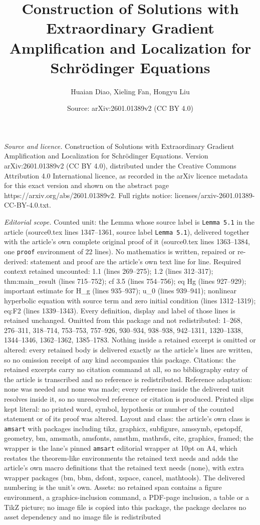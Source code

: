 \documentclass[10pt,a4paper]{amsart}
\title[Construction of Solutions with Extraordinary Gradient Amplif]{Construction of Solutions with Extraordinary Gradient Amplification and Localization for Schr\"odinger Equations}
\author{Huaian Diao, Xieling Fan, Hongyu Liu}
\date{Source: arXiv:2601.01389v2 (CC BY 4.0)}
\begin{document}
\maketitle

\noindent\emph{Source and licence.} Construction of Solutions with Extraordinary Gradient Amplification and Localization for Schr\"odinger Equations. Version arXiv:2601.01389v2 (CC BY 4.0), distributed under the Creative Commons Attribution 4.0 International licence, as recorded in the arXiv licence metadata for this exact version and shown on the abstract page https://arxiv.org/abs/2601.01389v2. Full rights notice: licenses/arxiv-2601.01389-CC-BY-4.0.txt.\par\smallskip

\noindent\textit{Editorial scope.} Counted unit: the Lemma whose source label is \texttt{Lemma 5.1} in the article (source0.tex lines 1347--1361, source label \texttt{Lemma 5.1}), delivered together with the article's own complete original proof of it (source0.tex lines 1363--1384, one \texttt{proof} environment of 22 lines). No mathematics is written, repaired or re-derived: statement and proof are the article's own text line for line. Required context retained uncounted: 1.1 (lines 269--275); 1.2 (lines 312--317); thm:main\_result (lines 715--752); cf 3.5 (lines 754--756); eq Hg (lines 927--929); important estimate for H\_g (lines 935--937); u\_0 (lines 939--941); nonlinear hyperbolic equation with source term and zero initial condition (lines 1312--1319); eq:F2 (lines 1339--1343). Every definition, display and label of those lines is retained unchanged. Omitted from this package and not redistributed: 1--268, 276--311, 318--714, 753--753, 757--926, 930--934, 938--938, 942--1311, 1320--1338, 1344--1346, 1362--1362, 1385--1783. Nothing inside a retained excerpt is omitted or altered: every retained body is delivered exactly as the article's lines are written, so no omission receipt of any kind accompanies this package. Citations: the retained excerpts carry no citation command at all, so no bibliography entry of the article is transcribed and no reference is redistributed. Reference adaptation: none was needed and none was made; every reference inside the delivered unit resolves inside it, so no unresolved reference or citation is produced. Printed slips kept literal: no printed word, symbol, hypothesis or number of the counted statement or of its proof was altered. Layout and class: the article's own class is \texttt{amsart} with packages including tikz, graphicx, subfigure, amssymb, epstopdf, geometry, bm, amsmath, amsfonts, amsthm, mathrsfs, cite, graphics, framed; the wrapper is the lane's pinned \texttt{amsart} editorial wrapper at 10pt on A4, which restates the theorem-like environments the retained text needs and adds the article's own macro definitions that the retained text needs (none), with extra wrapper packages (bm, bbm, dsfont, xspace, cancel, mathtools). The delivered numbering is the unit's own. Assets: no retained span contains a figure environment, a graphics-inclusion command, a PDF-page inclusion, a table or a TikZ picture; no image file is copied into this package, the package declares no asset dependency and no image file is redistributed 
\end{document}
